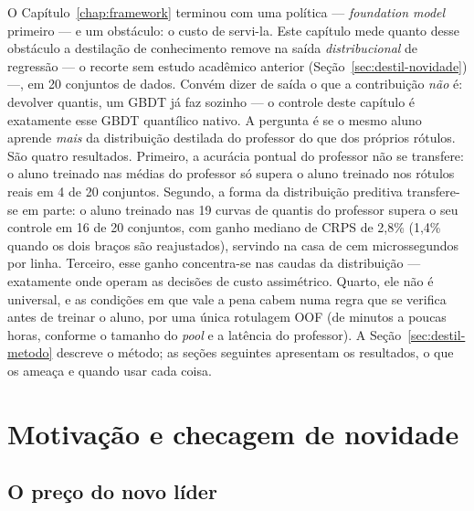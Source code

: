 O Capítulo~\ref{chap:framework} terminou com uma política ---
\emph{foundation model} primeiro --- e um obstáculo: o custo de
servi-la. Este capítulo mede quanto desse obstáculo a destilação de
conhecimento remove na saída \emph{distribucional} de regressão ---
o recorte sem estudo acadêmico anterior (Seção~\ref{sec:destil-novidade}) ---,
em 20 conjuntos de dados. Convém dizer de saída o que a
contribuição \emph{não} é: devolver quantis, um GBDT já faz sozinho
--- o controle deste capítulo é exatamente esse GBDT quantílico
nativo. A pergunta é se o mesmo aluno aprende \emph{mais} da
distribuição destilada do professor do que dos próprios rótulos. São
quatro resultados. Primeiro, a acurácia pontual do professor não se
transfere: o aluno treinado nas médias do professor só supera o aluno
treinado nos rótulos reais em 4 de 20 conjuntos. Segundo, a forma da
distribuição preditiva transfere-se em parte: o aluno treinado nas 19
curvas de quantis do professor supera o seu controle em 16 de 20
conjuntos, com ganho mediano de CRPS de 2,8\% (1,4\% quando os dois
braços são reajustados), servindo na casa de cem microssegundos por
linha. Terceiro, esse ganho concentra-se nas caudas da distribuição
--- exatamente onde operam as decisões de custo assimétrico. Quarto,
ele não é universal, e as condições em que vale a pena cabem numa
regra que se verifica antes de treinar o aluno, por uma única
rotulagem OOF (de minutos a poucas horas, conforme o tamanho do
\emph{pool} e a latência do professor).
A Seção~\ref{sec:destil-metodo}
descreve o método; as seções seguintes apresentam os resultados, o
que os ameaça e quando usar cada coisa.

\section{Motivação e checagem de novidade}
\label{sec:destil-motivacao}

\subsection{O preço do novo líder}
\label{sec:destil-preco}

